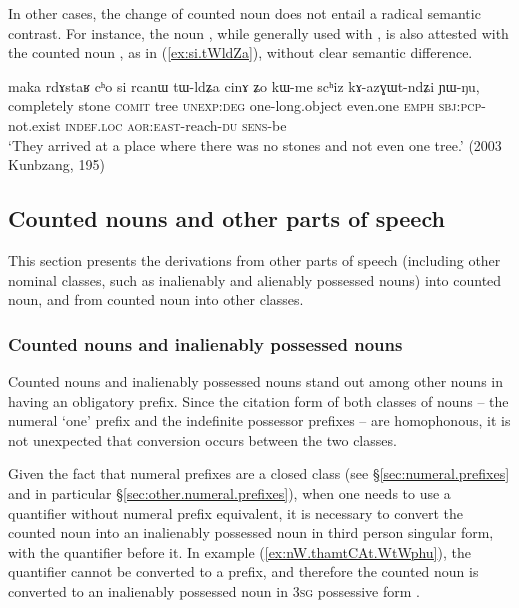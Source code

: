 In other cases, the change of counted noun does not entail a radical semantic contrast. For instance, the noun , while generally used with , is also attested with the counted noun , as in (\ref{ex:si.tWldZa}), without clear semantic difference.

\begin{exe}
\ex \label{ex:si.tWldZa}
\gll maka rdɤstaʁ cʰo si rcanɯ tɯ-ldʑa cinɤ ʑo kɯ-me scʰiz kɤ-azɣɯt-ndʑi ɲɯ-ŋu, \\
completely stone \textsc{comit} tree \textsc{unexp}:\textsc{deg} one-long.object even.one \textsc{emph} \textsc{sbj}:\textsc{pcp}-not.exist \textsc{indef}.\textsc{loc} \textsc{aor}:\textsc{east}-reach-\textsc{du} \textsc{sens}-be  \\
\glt `They arrived at a place where there was no stones and not even one tree.' (2003 Kunbzang, 195)
\end{exe}




\subsection{Counted nouns and other parts of speech} \label{sec:CN.parts.of.speech}

This section presents the derivations from other parts of speech (including other nominal classes, such as inalienably and alienably possessed nouns) into counted noun, and from counted noun into other classes.

\subsubsection{Counted nouns and inalienably possessed nouns}   \label{sec:CN.IPN}
Counted nouns and inalienably possessed nouns stand out among other nouns in having an obligatory prefix. Since the citation form of both classes of nouns -- the numeral `one' prefix  and the indefinite possessor prefixes  -- are homophonous, it is not unexpected that conversion occurs between the two classes. 

Given the fact that numeral prefixes are a closed class (see §\ref{sec:numeral.prefixes} and in particular §\ref{sec:other.numeral.prefixes}), when one needs to use a quantifier without numeral prefix equivalent, it is necessary to convert the counted noun into an inalienably possessed noun in third person singular form, with the quantifier before it. In example (\ref{ex:nW.thamtCAt.WtWphu}), the quantifier  cannot be converted to a prefix, and therefore the counted noun  is converted to an inalienably possessed noun in \textsc{3sg} possessive form .


